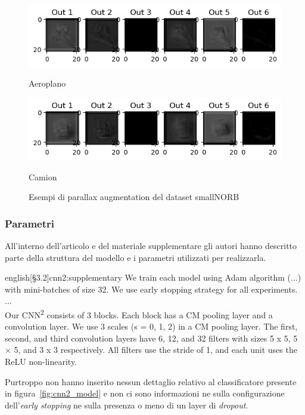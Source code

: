 \documentclass[italian,12pt,a4paper,oneside,final]{report}
\begin{document}
\begin{figure}[!ht]
		\centering
		\begin{subcaptionblock}{0.7\textwidth}
			\centering
			\includegraphics[width=1\linewidth]{smallnorb_M1_out_airplane.png}
			\caption{Aeroplano}
			\label{fig:smallnorb_M1_out_airplane}
		\end{subcaptionblock}%
		\hfill
		\begin{subcaptionblock}{0.7\textwidth}
			\centering
			\includegraphics[width=1\linewidth]{smallnorb_M1_out_truck.png}
			\caption{Camion}
			\label{fig:smallnorb_M1_out_truck}
		\end{subcaptionblock}%
	\caption{Esempi di parallax augmentation del dataset smallNORB}
	\label{fig:smallnorb_cmpooling_samples}
\end{figure}

\subsubsection{Parametri}
All'interno dell'articolo\cite{neurips2019:cnn2} e del materiale supplementare\cite{cnn2:supplementary} gli autori hanno descritto parte della struttura del modello e i parametri utilizzati per realizzarla.

\begin{foreigndisplaycquote}{english}[\S3.2]{cnn2:supplementary}
We train each model using Adam algorithm ($\ldots$) with mini-batches of size 32.
We use early stopping strategy for all experiments.\\
$\ldots$\\
Our CNN\textsuperscript{2} consists of 3 blocks. Each block has a CM pooling layer and a convolution layer.
We use 3 scales (s = 0, 1, 2) in a CM pooling layer.
The first, second, and third convolution layers have 6, 12, and 32 filters with sizes 5 x 5, 5 × 5, and 3 x 3 respectively.
All filters use the stride of 1, and each unit uses the ReLU non-linearity.
\end{foreigndisplaycquote}
Purtroppo non hanno inserito nessun dettaglio relativo al classificatore presente in figura~\ref{fig:cnn2_model} e non ci sono informazioni ne sulla configurazione dell'\textit{early stopping} ne sulla presenza o meno di un layer di \textit{dropout}.
\end{document}
